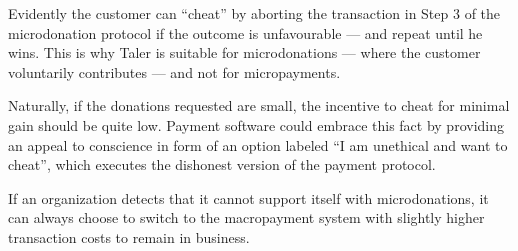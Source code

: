 \documentclass{llncs}
\begin{document}
Evidently the customer can ``cheat'' by aborting the transaction in
Step 3 of the microdonation protocol if the outcome is unfavourable ---
and repeat until he wins.  This is why Taler is suitable for
microdonations --- where the customer voluntarily contributes ---
and not for micropayments.

Naturally, if the donations requested are small, the incentive to
cheat for minimal gain should be quite low.  Payment software could
embrace this fact by providing an appeal to conscience in form of an
option labeled ``I am unethical and want to cheat'', which executes
the dishonest version of the payment protocol.

If an organization detects that it cannot support itself with
microdonations, it can always choose to switch to the macropayment
system with slightly higher transaction costs to remain in business.
\end{document}
